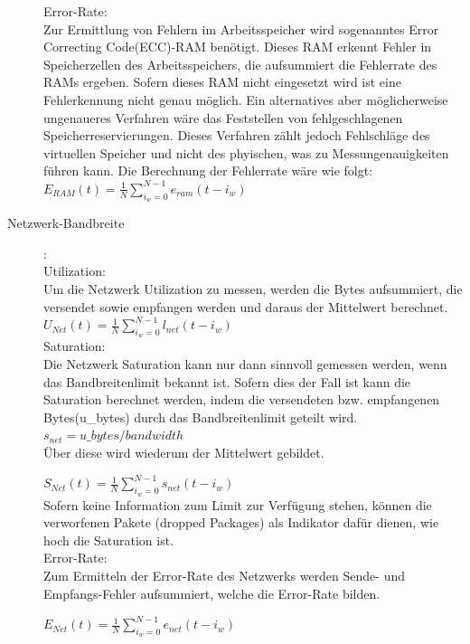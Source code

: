 \documentclass[a4paper,10pt]{scrartcl}
\begin{document}
\begin{description}
Error-Rate:\\
Zur Ermittlung von Fehlern im Arbeitsspeicher wird sogenanntes \glqq Error Correcting Code\grqq(ECC)-RAM benötigt. Dieses RAM erkennt Fehler in Speicherzellen des Arbeitsspeichers, die aufsummiert die Fehlerrate des RAMs ergeben. Sofern dieses RAM nicht eingesetzt wird ist eine Fehlerkennung nicht genau möglich. Ein alternatives aber möglicherweise ungenaueres Verfahren wäre das Feststellen von fehlgeschlagenen Speicherreservierungen. Dieses Verfahren zählt jedoch Fehlschläge des virtuellen Speicher und nicht des phyischen, was zu Messungenauigkeiten führen kann.
Die Berechnung der Fehlerrate wäre wie folgt:\\


\(
\displaystyle{E_{RAM}(t)=\frac{1}{N}{\sum\limits_{i_{w}=0}^{N-1} e_{ram}{(t-i_{w})}} }
\) 
\\

\pagebreak

\item[Netzwerk-Bandbreite]:\\
Utilization:\\
Um die Netzwerk Utilization zu messen, werden die Bytes aufsummiert, die versendet sowie empfangen werden und daraus der Mittelwert berechnet.\\

\(
\displaystyle{U_{Net}(t)=\frac{1}{N}{\sum\limits_{i_{w}=0}^{N-1} l_{net}{(t-i_{w})}} }
\) 
\\

Saturation:\\
Die Netzwerk Saturation kann nur dann sinnvoll gemessen werden, wenn das Bandbreitenlimit bekannt ist. Sofern dies der Fall ist kann die Saturation berechnet werden, indem die versendeten bzw. empfangenen Bytes(u\_bytes) durch das Bandbreitenlimit geteilt wird. \\


\(
\displaystyle{s_{net}=u\_bytes/bandwidth}
\) 
\\

Über diese wird wiederum der Mittelwert gebildet.

\(
\displaystyle{S_{Net}(t)=\frac{1}{N}{\sum\limits_{i_{w}=0}^{N-1} s_{net}{(t-i_{w})}} }
\) 
\\

Sofern keine Information zum Limit zur Verfügung stehen, können die verworfenen Pakete (dropped Packages) als Indikator dafür dienen, wie hoch die Saturation ist.\\

Error-Rate:\\
Zum Ermitteln der Error-Rate des Netzwerks werden Sende- und Empfangs-Fehler aufsummiert, welche die Error-Rate bilden.


\(
\displaystyle{E_{Net}(t)=\frac{1}{N}{\sum\limits_{i_{w}=0}^{N-1} e_{net}{(t-i_{w})}} }
\) 
\\

\end{description}
\end{document}
